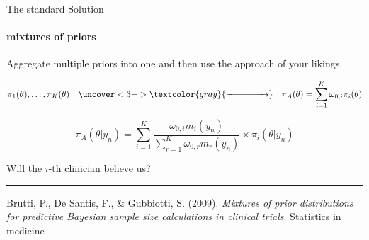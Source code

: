 \documentclass[9 pt]{beamer}
\begin{document}
\begin{frame}{The standard Solution}
\protect\hypertarget{the-standard-solution}{}

\framesubtitle{mixtures of priors}

Aggregate multiple priors into one and then use the approach of your likings. 

\vspace{0.5cm}

\pause


 \[\pi_1(\theta), \dots, \pi_K(\theta)\quad
    \uncover<3-> {
    \textcolor{gray}{\xrightarrow{\hspace*{1.5cm}}} \quad
    \pi_A (\theta) = \sum_{i=1} ^ K \omega_{0,i} \pi_i(\theta)
    }
\]

\pause

\pause

\[ \pi_A(\theta|y_n) = \sum_{i = 1} ^K {\frac{\omega_{0,i} m_i(y_n)}{\sum_{r = 1} ^K \omega_{0,r} m_r(y_n)} \times \pi_i(\theta|y_n)}  \]

\pause

\begin{exampleblock}

\begin{center}
Will the $i$-th clinician believe us? 
\end{center}
\end{exampleblock}

\textcolor[RGB]{220,220,220}{\rule{\linewidth}{0.2pt}}

\tiny{\faBook \;Brutti, P., De Santis, F., \& Gubbiotti, S. (2009). \textit{Mixtures of prior distributions for predictive Bayesian sample size calculations in clinical trials}. Statistics in medicine}

\end{frame}
\end{document}

